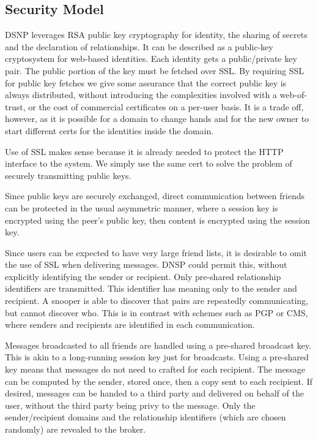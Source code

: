 \documentclass[letterpaper,11pt,oneside]{article}
\begin{document}
\subsection{Security Model}

DSNP leverages RSA public key cryptography for identity, the sharing of secrets
and the declaration of relationships. It can be described as a public-key
cryptosystem for web-based identities. Each identity gets a public/private key
pair. The public portion of the key must be fetched over SSL. By requiring SSL
for public key fetches we give some assurance that the correct public key is
always distributed, without introducing the complexities involved with a
web-of-trust, or the cost of commercial certificates on a per-user basis. It is
a trade off, however, as it is possible for a domain to change hands and for
the new owner to start different certs for the identities inside the domain.

Use of SSL makes sense because it is already needed to protect the HTTP
interface to the system. We simply use the same cert to solve the problem of
securely transmitting public keys.

Since public keys are securely exchanged, direct communication between friends
can be protected in the usual asymmetric manner, where a session key is
encrypted using the peer's public key, then content is encrypted using the
session key.

Since users can be expected to have very large friend lists, it is desirable to
omit the use of SSL when delivering messages. DNSP could permit this, without
explicitly identifying the sender or recipient. Only pre-shared relationship
identifiers are transmitted. This identifier has meaning only to the sender and
recipient. A snooper is able to discover that pairs are repeatedly
communicating, but cannot discover who. This is in contrast with schemes such
as PGP or CMS, where senders and recipients are identified in each
communication.

Messages broadcasted to all friends are handled using a pre-shared broadcast
key. This is akin to a long-running session key just for broadcasts. Using a
pre-shared key means that messages do not need to crafted for each recipient.
The message can be computed by the sender, stored once, then a copy sent to
each recipient. If desired, messages can be handed to a third party and
delivered on behalf of the user, without the third party being privy to the
message. Only the sender/recipient domains and the relationship identifiers
(which are chosen randomly) are revealed to the broker. 
\end{document}
